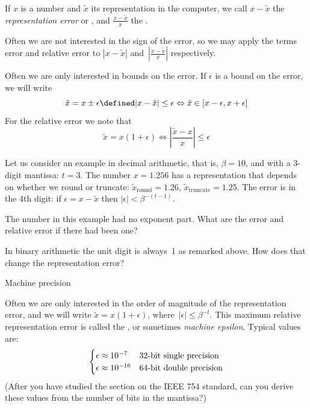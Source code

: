 If $x$ is a number and $\tilde x$ its representation in the computer,
we call $x-\tilde x$ the \emph{representation error} or
, and $\frac{x-\tilde x}{x}$
the .

Often we are not
interested in the sign of the error, so we may apply the terms error
and relative error to $|x-\tilde x|$ and~$|\frac{x-\tilde x}{x}|$
respectively.

Often we are only interested in bounds on the error. If $\epsilon$ is
a bound on the error, we will write
\begin{equation}
  \tilde x = x\pm\epsilon \defined
    |x-\tilde x|\leq\epsilon 
    \Leftrightarrow \tilde x\in[x-\epsilon,x+\epsilon]
\end{equation}
For the relative error we note that
\begin{equation}
  \tilde x =x(1+\epsilon) \Leftrightarrow
    \left|\frac{\tilde x-x}{x}\right|\leq \epsilon
\end{equation}

Let us consider an example in decimal arithmetic, that is, $\beta=10$,
and with a 3-digit mantissa: $t=3$.  The number $x=1.256$ has a
representation that depends on whether we round or truncate: $\tilde
x_{\mathrm{round}}=1.26$, $\tilde x_{\mathrm{truncate}}=1.25$.
The error is in the 4th digit: if $\epsilon=x-\tilde x$ 
then $|\epsilon|<\beta^{-(t-1)}$.

\begin{exercise}
The number in this example had no exponent part. What are the error
and relative error if there had been one?
\end{exercise}
\begin{exercise}
  In binary arithmetic the unit digit is always~1 as remarked above.
  How does that change the representation error?
\end{exercise}

 {Machine precision}
\label{sec:machine-eps}

Often we are only interested in the order of magnitude of the
representation error,
and we will write $\tilde x=x(1+\epsilon)$, where~$|\epsilon|\leq\beta^{-t}$.
This maximum relative representation error is called the
,
or sometimes
\emph{machine epsilon}.
Typical values are:
\begin{equation} 
\begin{cases}
  \epsilon\approx10^{-7}&\hbox{32-bit single precision}\\
  \epsilon\approx10^{-16}&\hbox{64-bit double precision}
\end{cases}
\end{equation}
(After you have studied the section on the IEEE 754 standard,
can you derive these values from the number of bits in the mantissa?)

